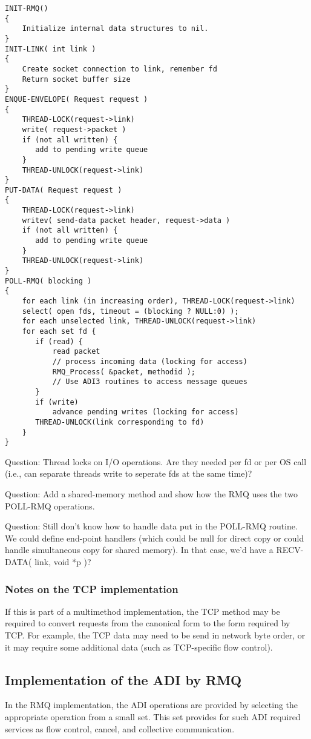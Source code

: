 \documentclass{article}
\begin{document}
\begin{verbatim}
INIT-RMQ()
{
    Initialize internal data structures to nil.
}
INIT-LINK( int link )
{
    Create socket connection to link, remember fd
    Return socket buffer size
}
ENQUE-ENVELOPE( Request request )
{
    THREAD-LOCK(request->link)
    write( request->packet )
    if (not all written) {
       add to pending write queue
    }
    THREAD-UNLOCK(request->link)
}
PUT-DATA( Request request )
{
    THREAD-LOCK(request->link)
    writev( send-data packet header, request->data )
    if (not all written) {
       add to pending write queue
    }
    THREAD-UNLOCK(request->link)
}
POLL-RMQ( blocking )
{
    for each link (in increasing order), THREAD-LOCK(request->link)
    select( open fds, timeout = (blocking ? NULL:0) );
    for each unselected link, THREAD-UNLOCK(request->link)
    for each set fd {
       if (read) {
           read packet
           // process incoming data (locking for access)
           RMQ_Process( &packet, methodid );
           // Use ADI3 routines to access message queues
       }
       if (write)
           advance pending writes (locking for access)
       THREAD-UNLOCK(link corresponding to fd)
    }
}
\end{verbatim}
Question: Thread locks on I/O operations.  Are they needed per fd or per OS
call (i.e., can separate threads write to seperate fds at the same time)?

Question: Add a shared-memory method and show how the RMQ uses the two
POLL-RMQ operations.

Question: Still don't know how to handle data put in the POLL-RMQ routine.
We could define end-point handlers (which could be null for direct copy or
could handle simultaneous copy for shared memory).  In that case, we'd have 
a RECV-DATA( link, void *p )?

\subsubsection{Notes on the TCP implementation}
If this is part of a multimethod implementation, the TCP method may be
required to convert requests from the canonical form to the form required by
TCP.  For example, the TCP data may need to be send in network byte order, or
it may require some additional data (such as TCP-specific flow control).

\subsection{Implementation of the ADI by RMQ}
In the RMQ implementation, the ADI operations are provided by selecting the
appropriate operation from a small set.  This set provides for such ADI
required services as flow control, cancel, and collective communication.
\end{document}
